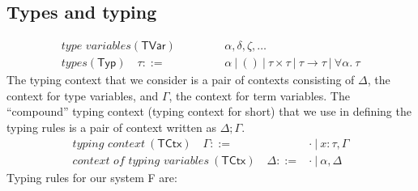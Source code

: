 \documentclass{article}
\newcommand{\gor}{~|~}
\newcommand{\fst}{\mathit{fst}}
\newcommand{\snd}{\mathit{snd}}
\newcommand{\TT}{\mathit{tt}}
\newcommand{\TYP}{\mathsf{Typ}}
\newcommand{\UNT}{()}
\newcommand{\TCTX}{\mathsf{TCtx}}
\newcommand{\TVAR}{\mathsf{TVar}}
\newcommand{\TArg}{\_}
\newcommand{\TLam}{\Lambda}
\newcommand{\Tctx}{\Gamma}
\newcommand{\CtxTps}{\Delta}
\newcommand{\expr}{e}
\newcommand{\var}{x}
\newcommand{\typ}{\tau}
\newcommand{\TForall}{\forall}
\newcommand{\tvar}{\alpha}
\newcommand{\tvarB}{\delta}
\newcommand{\tvarC}{\zeta}
\newcommand{\typed}[4]{#1; #2 \vdash #3 : #4}
\begin{document}
\subsection{Types and typing}
\begin{align*}
\textit{type variables} (\TVAR) \hspace{1em} \phantom{\expr ::={}} & \tvar, \tvarB, \tvarC, \dots\\
\textit{types} (\TYP) \hspace{1em} \typ ::={}& \tvar \gor \UNT \gor \typ \times\typ
\gor \typ \to \typ \gor \TForall \tvar.~\typ
\end{align*}
The typing context that we consider is a pair of contexts consisting of $\CtxTps$, the context for type variables, and $\Tctx$, the context for term variables.
The ``compound'' typing context (typing context for short) that we use in defining the typing rules is a pair of context written as $\CtxTps; \Tctx$.
\begin{align*}
\textit{typing context}~(\TCTX)\hspace{1em} \Tctx ::={}& \cdot \gor x : \typ, \Tctx\\
\textit{context of typing variables}~(\TCTX)\hspace{1em} \CtxTps ::={}& \cdot \gor \tvar, \CtxTps
\end{align*}
Typing rules for our system F are:\\[0.5em]
\hspace*{1em}\fbox{$\typed{\CtxTps}{\Tctx}{\expr}{\typ}$}
\end{document}
